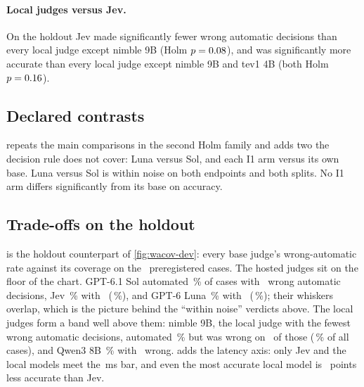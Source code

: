 \paragraph{Local judges versus Jev.} On the holdout Jev made significantly fewer wrong automatic
decisions than every local judge except nimble 9B (Holm $p = 0.08$), and was significantly
more accurate than every local judge except nimble 9B and tev1 4B (both Holm $p = 0.16$).

\subsection{Declared contrasts}

\begin{table}[htbp]
\centering\small
\caption{The \HoldPairwiseFamily\ contrasts declared in the run configuration, on both splits, for
accuracy and wrong-automatic rate. $A-B$ in percentage points; Holm correction within this family.
Bold Holm $p \le 0.05$.}
\label{tab:pairwise}

\end{table}

 repeats the main comparisons in the second Holm family and adds two the decision
rule does not cover: Luna versus Sol, and each I1 arm versus its own base. Luna versus Sol is within noise
on both endpoints and both splits. No I1 arm differs significantly from its base on accuracy.

\subsection{Trade-offs on the holdout}

 is the holdout counterpart of \cref{fig:wacov-dev}: every base judge's
wrong-automatic rate against its coverage on the \HoldN\ preregistered cases. The hosted judges sit on
the floor of the chart. GPT-6.1 Sol automated \SolHoldCovPct\,\% of cases with \SolHoldWaK\ wrong
automatic decisions, Jev \JevHoldCovPct\,\% with \JevHoldWaK\ (\JevHoldWaPct\,\%), and GPT-6 Luna
\LunaHoldCovPct\,\% with \LunaHoldWaK\ (\LunaHoldWaPct\,\%); their whiskers overlap, which is the
picture behind the ``within noise'' verdicts above. The local judges form a band well above them: nimble
9B, the local judge with the fewest wrong automatic decisions, automated \NimbleHoldCovPct\,\% but was wrong on \NimbleHoldWaK\ of those
(\NimbleHoldWaPct\,\% of all cases), and Qwen3 8B \QwenEightHoldCovPct\,\% with \QwenEightHoldWaK\ wrong.
 adds the latency axis: only Jev and the local models meet the
\RuleOneMaxPninetyfive\,ms bar, and even the most accurate local model is \LocalHoldAccGap\ points less
accurate than Jev.

